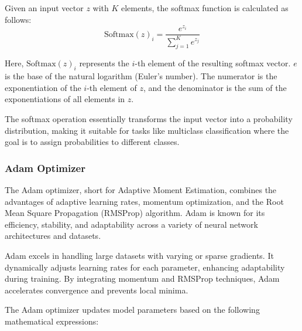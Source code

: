 \noindent Given an input vector \(z\) with \(K\) elements, the softmax function is calculated as follows:
\begin{equation}
    \text{Softmax}(z)_i = \frac{e^{z_i}}{\sum_{j=1}^{K} e^{z_j}} \label{eq:softmax}
\end{equation}


\noindent Here, \(\text{Softmax}(z)_i\) represents the \(i\)-th element of the resulting softmax vector. \(e\) is the base of the natural logarithm (Euler's number). The numerator is the exponentiation of the \(i\)-th element of \(z\), and the denominator is the sum of the exponentiations of all elements in \(z\).

\noindent The softmax operation essentially transforms the input vector into a probability distribution, making it suitable for tasks like multiclass classification where the goal is to assign probabilities to different classes.

\subsubsection{Adam Optimizer}

\noindent The Adam optimizer, short for Adaptive Moment Estimation, combines the advantages of adaptive learning rates, momentum optimization, and the Root Mean Square Propagation (RMSProp) algorithm. Adam is known for its efficiency, stability, and adaptability across a variety of neural network architectures and datasets.

\noindent Adam excels in handling large datasets with varying or sparse gradients. It dynamically adjusts learning rates for each parameter, enhancing adaptability during training. By integrating momentum and RMSProp techniques, Adam accelerates convergence and prevents local minima.

\noindent The Adam optimizer updates model parameters based on the following mathematical expressions:

